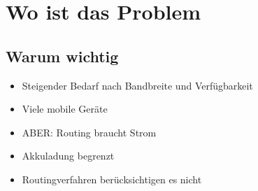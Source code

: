 \documentclass[11pt,landscape]{beamer}
\begin{document}

\section{Wo ist das Problem}

%
%

\subsection{Warum wichtig}

\begin{frame}{\insertsubsection}
\begin{itemize}
\item Steigender Bedarf nach Bandbreite und Verfügbarkeit\newline
\item Viele mobile Geräte\newline
\item ABER: Routing braucht Strom\newline
\item Akkuladung begrenzt\newline
\item Routingverfahren berücksichtigen es nicht
\end{itemize}
\end{frame}
\end{document}
